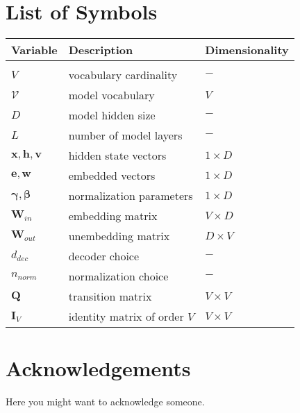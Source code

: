 \documentclass{Configuration_Files/PoliMi3i_thesis}
\newcommand{\gbm}[1]{\bm{\mathbf{#1}}} %
\begin{document}
\chapter*{List of Symbols} %
\begin{table}[H]
    \centering
    \begin{tabular}{lll}
        \textbf{Variable} & \textbf{Description} & \textbf{Dimensionality} \\
		\midrule \\[-9px]
		$V$ & vocabulary cardinality & $-$ \\[2px]
		$\mathcal{V}$ & model vocabulary & $V$ \\[2px]
		$D$ & model hidden size & $-$ \\[2px]
		$L$ & number of model layers & $-$ \\[2px]
		$\gbm{x}, \gbm{h}, \gbm{v}$ & hidden state vectors & $1 \times D$ \\[2px]
		$\gbm{e}, \gbm{w}$ & embedded vectors & $1 \times D$ \\[2px]
		$\gbm{\gamma}, \gbm{\beta}$ & normalization parameters & $1 \times D$ \\[2px]
		$\gbm{W}_{in}$ & embedding matrix & $V \times D$ \\[2px]
		$\gbm{W}_{out}$ & unembedding matrix & $D \times V$ \\[2px]
		$d_{dec}$ & decoder choice & $-$ \\[2px]
		$n_{norm}$ & normalization choice & $-$ \\[2px]
		$\gbm{Q}$ & transition matrix & $V \times V$ \\[2px]
		$\gbm{I}_V$ & identity matrix of order $V$ & $V \times V$ \\[2px]
    \end{tabular}
\end{table}

\chapter*{Acknowledgements}
Here you might want to acknowledge someone.

\cleardoublepage
\end{document}
